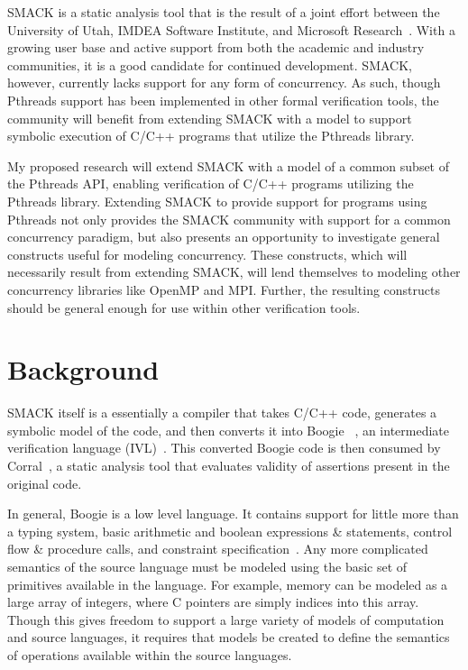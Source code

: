 \documentclass{scrartcl}
\begin{document}
SMACK is a static analysis tool that is the result of a joint effort between the University of Utah, IMDEA Software Institute, and Microsoft Research~\cite{smack}.  With a growing user base and active support from both the academic and industry communities, it is a good candidate for continued development.  SMACK, however, currently lacks support for any form of concurrency.  As such, though Pthreads support has been implemented in other formal verification tools, the community will benefit from extending SMACK with a model to support symbolic execution of C/C++ programs that utilize the Pthreads library.

My proposed research will extend SMACK with a model of a common subset of the Pthreads API, enabling verification of C/C++ programs utilizing the Pthreads library.  Extending SMACK to provide support for programs using Pthreads not only provides the SMACK community with support for a common concurrency paradigm, but also presents an opportunity to investigate general constructs useful for modeling concurrency.  These constructs, which will necessarily result from extending SMACK, will lend themselves to modeling other concurrency libraries like OpenMP and MPI.  Further, the resulting constructs should be general enough for use within other verification tools.


\section{Background}
SMACK itself is a essentially a compiler that takes C/C++ code, generates a symbolic model of the code, and then converts it into Boogie ~\cite{boogie}, an intermediate verification language (IVL)~\cite{smack}.  This converted Boogie code is then consumed by Corral~\cite{corral}, a static analysis tool that evaluates validity of assertions present in the original code.

In general, Boogie is a low level language.  It contains support for little more than a typing system, basic arithmetic and boolean expressions \& statements, control flow \& procedure calls, and constraint specification~\cite{boogie}.  Any more complicated semantics of the source language must be modeled using the basic set of primitives available in the language.  For example, memory can be modeled as a large array of integers, where C pointers are simply indices into this array.  Though this gives freedom to support a large variety of models of computation and source languages, it requires that models be created to define the semantics of operations available within the source languages.
\end{document}
